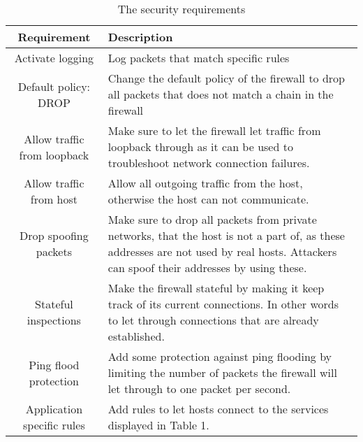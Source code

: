 \begin{table}[htp]
\renewcommand{\arraystretch}{1.5}
\centering
	\begin{tabular}{| c | p{8cm} | }
	\hline
	 Requirement & Description \\ \hline
	 Activate logging & Log packets that match specific rules  \\
	 Default policy: DROP & Change the default policy of the firewall to drop all packets that does not match a chain in the firewall \\
	 Allow traffic from loopback & Make sure to let the firewall let traffic from loopback through as it can be used to troubleshoot network connection failures. \\
	 Allow traffic from host & Allow all outgoing traffic from the host, otherwise the host can not communicate. \\
	 Drop spoofing packets & Make sure to drop all packets from private networks, that the host is not a part of, as these addresses are not used by real hosts. Attackers can spoof their addresses by using these. \\
	 Stateful inspections & Make the firewall stateful by making it keep track of its current connections. In other words to let through connections that are already established. \\
	 Ping flood protection & Add some protection against ping flooding by limiting the number of packets the firewall will let through to one packet per second. \\ 
	 Application specific rules & Add rules to let hosts connect to the services displayed in Table 1. \\
	\hline
	\end{tabular}
	\caption{The security requirements}
	\label{Security requirements table}
\end{table}

